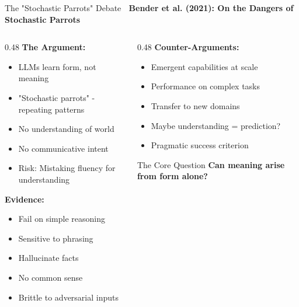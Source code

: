 \documentclass[aspectratio=169]{beamer}
\begin{document}
\begin{frame}[shrink=10]{The "Stochastic Parrots" Debate 🦜}
\textbf{Bender et al. (2021): On the Dangers of Stochastic Parrots}

\vspace{1em}

\begin{columns}[T]
\begin{column}{0.48\textwidth}
\textbf{The Argument:}
\begin{itemize}\setlength{\itemsep}{0pt}
    \item LLMs learn form, not meaning
    \item "Stochastic parrots" - repeating patterns
    \item No understanding of world
    \item No communicative intent
    \item Risk: Mistaking fluency for understanding
\end{itemize}

\vspace{0.5em}
\textbf{Evidence:}
\begin{itemize}\setlength{\itemsep}{0pt}
    \item Fail on simple reasoning
    \item Sensitive to phrasing
    \item Hallucinate facts
    \item No common sense
    \item Brittle to adversarial inputs
\end{itemize}
\end{column}

\begin{column}{0.48\textwidth}
\textbf{Counter-Arguments:}
\begin{itemize}\setlength{\itemsep}{0pt}
    \item Emergent capabilities at scale
    \item Performance on complex tasks
    \item Transfer to new domains
    \item Maybe understanding = prediction?
    \item Pragmatic success criterion
\end{itemize}

\vspace{1em}
\begin{alertblock}{The Core Question}
\textbf{Can meaning arise from form alone?}


\end{alertblock}
\end{column}
\end{columns}
\end{frame}
\end{document}
